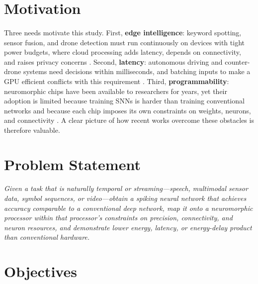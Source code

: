 \documentclass[12pt,a4paper,final]{extreport}
\begin{document}
\section{Motivation}

\paragraph{} Three needs motivate this study. First, \textbf{edge intelligence}: keyword spotting, sensor fusion, and drone detection must run continuously on devices with tight power budgets, where cloud processing adds latency, depends on connectivity, and raises privacy concerns \cite{p1,p2}. Second, \textbf{latency}: autonomous driving and counter-drone systems need decisions within milliseconds, and batching inputs to make a GPU efficient conflicts with this requirement \cite{p1,p4}. Third, \textbf{programmability}: neuromorphic chips have been available to researchers for years, yet their adoption is limited because training SNNs is harder than training conventional networks and because each chip imposes its own constraints on weights, neurons, and connectivity \cite{p3,p4}. A clear picture of how recent works overcome these obstacles is therefore valuable.

\section{Problem Statement}

\paragraph{} \emph{Given a task that is naturally temporal or streaming---speech, multimodal sensor data, symbol sequences, or video---obtain a spiking neural network that achieves accuracy comparable to a conventional deep network, map it onto a neuromorphic processor within that processor's constraints on precision, connectivity, and neuron resources, and demonstrate lower energy, latency, or energy-delay product than conventional hardware.}

\section{Objectives}
\end{document}
